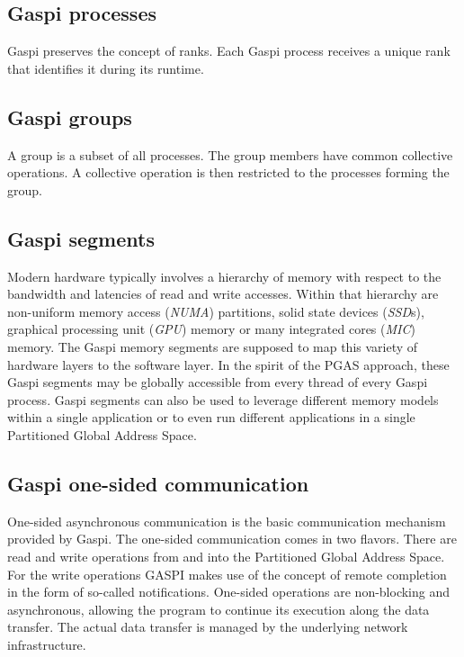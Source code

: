 \documentclass[a4paper]{article}
\newlength{\st}\setlength{\st}{0pt}
\newcommand{\GASPI}{{\sc Gaspi}}
\begin{document}
\subsection{\GASPI{} processes}


\GASPI{} preserves the concept of ranks. Each \GASPI{} process receives
a unique rank that identifies it during its runtime.

\subsection{\GASPI{} groups}

A group is a subset of all processes. The group members
have common collective operations. A collective operation is then
restricted to the processes forming the group.

\subsection{\GASPI{} segments}

Modern hardware typically involves a hierarchy of memory with respect to the
bandwidth and latencies of read and write accesses. Within that hierarchy are
non-uniform memory access (\emph{NUMA}) partitions, solid state
devices (\emph{SSD}s), graphical processing unit (\emph{GPU}) memory
or many integrated cores (\emph{MIC}) memory.  The \GASPI{} memory
segments are supposed to map this variety of hardware layers to the software
layer. In the spirit of the PGAS approach, these \GASPI{} segments
may be globally accessible from every thread of every \GASPI{} process.
\GASPI{} segments can also be used to leverage different memory models within
a single application or to even run different applications in a single Partitioned Global
Address Space.

\subsection{\GASPI{} one-sided communication}

One-sided asynchronous communication is the basic communication
mechanism provided by \GASPI{}. The one-sided communication comes
in two flavors.  There are read and write operations from and into the
Partitioned Global Address Space. For the write operations GASPI makes use of the 
concept of remote completion in the form of so-called notifications. 
One-sided operations are non-blocking and asynchronous, allowing the program to continue
its execution along the data transfer. The actual data transfer is managed
by the underlying network infrastructure.
\end{document}
